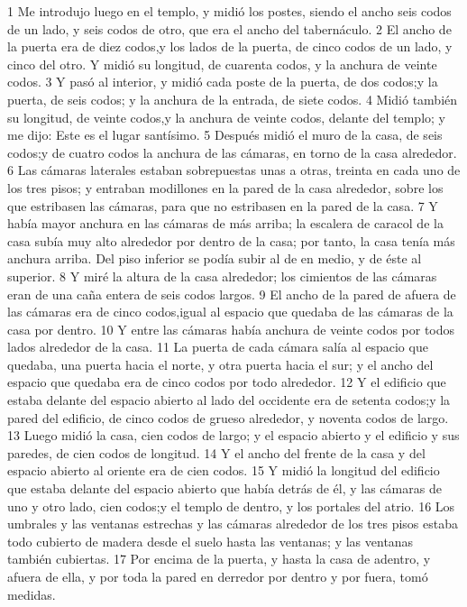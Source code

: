 1 Me introdujo luego en el templo, y midió los postes, siendo el ancho seis codos de un lado, y seis codos de otro, que era el ancho del tabernáculo.
2 El ancho de la puerta era de diez codos,y los lados de la puerta, de cinco codos de un lado, y cinco del otro. Y midió su longitud, de cuarenta codos, y la anchura de veinte codos.
3 Y pasó al interior, y midió cada poste de la puerta, de dos codos;y la puerta, de seis codos; y la anchura de la entrada, de siete codos.
4 Midió también su longitud, de veinte codos,y la anchura de veinte codos, delante del templo; y me dijo: Este es el lugar santísimo.
5 Después midió el muro de la casa, de seis codos;y de cuatro codos la anchura de las cámaras, en torno de la casa alrededor.
6 Las cámaras laterales estaban sobrepuestas unas a otras, treinta en cada uno de los tres pisos; y entraban modillones en la pared de la casa alrededor, sobre los que estribasen las cámaras, para que no estribasen en la pared de la casa.
7 Y había mayor anchura en las cámaras de más arriba; la escalera de caracol de la casa subía muy alto alrededor por dentro de la casa; por tanto, la casa tenía más anchura arriba. Del piso inferior se podía subir al de en medio, y de éste al superior.
8 Y miré la altura de la casa alrededor; los cimientos de las cámaras eran de una caña entera de seis codos largos.
9 El ancho de la pared de afuera de las cámaras era de cinco codos,igual al espacio que quedaba de las cámaras de la casa por dentro.
10 Y entre las cámaras había anchura de veinte codos por todos lados alrededor de la casa.
11 La puerta de cada cámara salía al espacio que quedaba, una puerta hacia el norte, y otra puerta hacia el sur; y el ancho del espacio que quedaba era de cinco codos por todo alrededor.
12 Y el edificio que estaba delante del espacio abierto al lado del occidente era de setenta codos;y la pared del edificio, de cinco codos de grueso alrededor, y noventa codos de largo.
13 Luego midió la casa, cien codos de largo; y el espacio abierto y el edificio y sus paredes, de cien codos de longitud.
14 Y el ancho del frente de la casa y del espacio abierto al oriente era de cien codos.
15 Y midió la longitud del edificio que estaba delante del espacio abierto que había detrás de él, y las cámaras de uno y otro lado, cien codos;y el templo de dentro, y los portales del atrio.
16 Los umbrales y las ventanas estrechas y las cámaras alrededor de los tres pisos estaba todo cubierto de madera desde el suelo hasta las ventanas; y las ventanas también cubiertas.
17 Por encima de la puerta, y hasta la casa de adentro, y afuera de ella, y por toda la pared en derredor por dentro y por fuera, tomó medidas.
